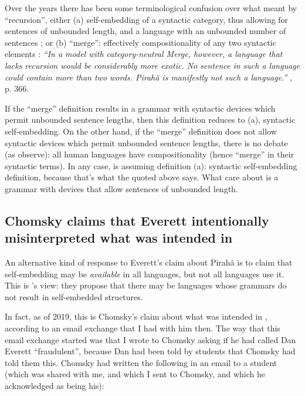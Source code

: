 \documentclass{article}
\begin{document}
Over the years there has been some terminological confusion over what \cite{hauser2002faculty} meant by ``recursion'', either (a) self-embedding of a syntactic category, thus allowing for sentences of unbounded length, and a language with an unbounded number of sentences \citep{everett2005cultural}; or (b) ``merge'': effectively compositionality of any two syntactic elements \citep{nevins2009evidence}: \textit{``In a model with category-neutral Merge, however, a language that lacks recursion would be considerably more exotic. No sentence in such a language could contain more than two words. Pirahã is manifestly not such a language.''} \cite{nevins2009evidence}, p. 366.

If the ``merge'' definition results in a grammar with syntactic devices which permit unbounded sentence lengths, then this definition reduces to (a), syntactic self-embedding. On the other hand, if the ``merge'' definition does not allow syntactic devices which permit unbounded sentence lengths, there is no debate (as \cite{nevins2009evidence} observe): all human languages have compositionality (hence ``merge'' in their syntactic terms). In any case, \cite{everett2005cultural} is assuming definition (a): syntactic self-embedding definition, because that’s what the \cite{hauser2002faculty} quoted above says. What \cite{hauser2002faculty} care about is a grammar with devices that allow sentences of unbounded length.

\subsection{Chomsky claims that Everett intentionally misinterpreted what was intended in \cite{hauser2002faculty}}

An alternative kind of response to Everett’s claim about Pirahã is to claim that self-embedding may be \textit{available} in all languages, but not all languages use it. This is \cite{jackendoff2014what}’s view: they propose that there may be languages whose grammars do not result in self-embedded structures.

In fact, as of 2019, this is Chomsky’s claim about what was intended in \cite{hauser2002faculty}, according to an email exchange that I had with him then. The way that this email exchange started was that I wrote to Chomsky asking if he had called Dan Everett ``fraudulent'', because Dan had been told by students that Chomsky had told them this. Chomsky had written the following in an email to a student (which was shared with me, and which I sent to Chomsky, and which he acknowledged as being his):
\end{document}
